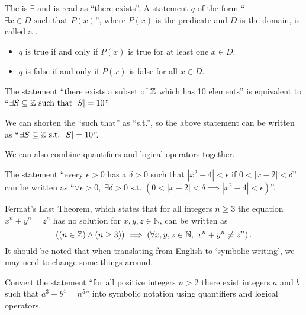 \begin{definition}
    The  is $\exists$ and is read as ``there exists''. A statement $q$ of the form ``$\exists x \in D \textrm{ such that } P(x)$'', where $P(x)$ is the predicate and $D$ is the domain, is called a .
    \begin{itemize}
        \item $q$ is true if and only if $P(x)$ is true for at least one $x \in D$.
        \item $q$ is false if and only if $P(x)$ is false for all $x \in D$.
    \end{itemize}
\end{definition}

\begin{example}
    The statement ``there exists a subset of $\mathbb{Z}$ which has 10 elements'' is equivalent to ``$\exists S \subseteq \mathbb{Z} \text{ such that } |S| = 10$''.
\end{example}
\begin{remark}
    We can shorten the ``such that'' as ``s.t.'', so the above statement can be written as ``$\exists S \subseteq \mathbb{Z} \text{ s.t. } |S| = 10$''.
\end{remark}

We can also combine quantifiers and logical operators together.
\begin{example}
    The statement ``every $\epsilon > 0$ has a $\delta > 0$ such that $|x^2 - 4| < \epsilon$ if $0 < |x - 2| < \delta$'' can be written as ``$\forall \epsilon > 0,\;\exists \delta > 0 \text{ s.t. } (0 < |x - 2| < \delta \implies |x^2 - 4| < \epsilon)$''.
\end{example}

\begin{example}
    Fermat's Last Theorem, which states that for all integers $n\geq 3$ the equation $x^n + y^n = z^n$ has no solution for $x, y, z \in \mathbb{N}$, can be written as
    \[
        \left((n \in \mathbb{Z}) \land (n \geq 3)\right) \implies \left(\forall x, y, z \in \mathbb{N},\; x^n + y^n \neq z^n\right).
    \]
    It should be noted that when translating from English to `symbolic writing', we may need to change some things around.
\end{example}

\begin{exercise}
    Convert the statement ``for all positive integers $n > 2$ there exist integers $a$ and $b$ such that $a^3 + b^4 = n^5$'' into symbolic notation using quantifiers and logical operators.
\end{exercise}

